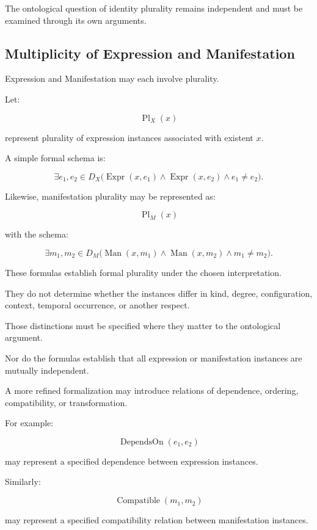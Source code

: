 The ontological question
of identity plurality remains
independent and must be
examined through its own
arguments.

\subsection{Multiplicity of Expression and Manifestation}

Expression and Manifestation
may each involve plurality.

Let:

\[
    \operatorname{Pl}_{X}(x)
\]

represent plurality of expression
instances associated with
existent \(x\).

A simple formal schema is:

\[
    \exists e_1,e_2 \in D_X
    \bigl(
        \operatorname{Expr}(x,e_1)
        \land
        \operatorname{Expr}(x,e_2)
        \land
        e_1 \neq e_2
    \bigr).
\]

Likewise, manifestation plurality
may be represented as:

\[
    \operatorname{Pl}_{M}(x)
\]

with the schema:

\[
    \exists m_1,m_2 \in D_M
    \bigl(
        \operatorname{Man}(x,m_1)
        \land
        \operatorname{Man}(x,m_2)
        \land
        m_1 \neq m_2
    \bigr).
\]

These formulas establish
formal plurality under the
chosen interpretation.

They do not determine
whether the instances differ
in kind, degree, configuration,
context, temporal occurrence,
or another respect.

Those distinctions must
be specified where they
matter to the ontological
argument.

Nor do the formulas establish
that all expression or
manifestation instances
are mutually independent.

A more refined formalization
may introduce relations
of dependence, ordering,
compatibility, or transformation.

For example:

\[
    \operatorname{DependsOn}(e_1,e_2)
\]

may represent a specified
dependence between expression
instances.

Similarly:

\[
    \operatorname{Compatible}(m_1,m_2)
\]

may represent a specified
compatibility relation between
manifestation instances.

